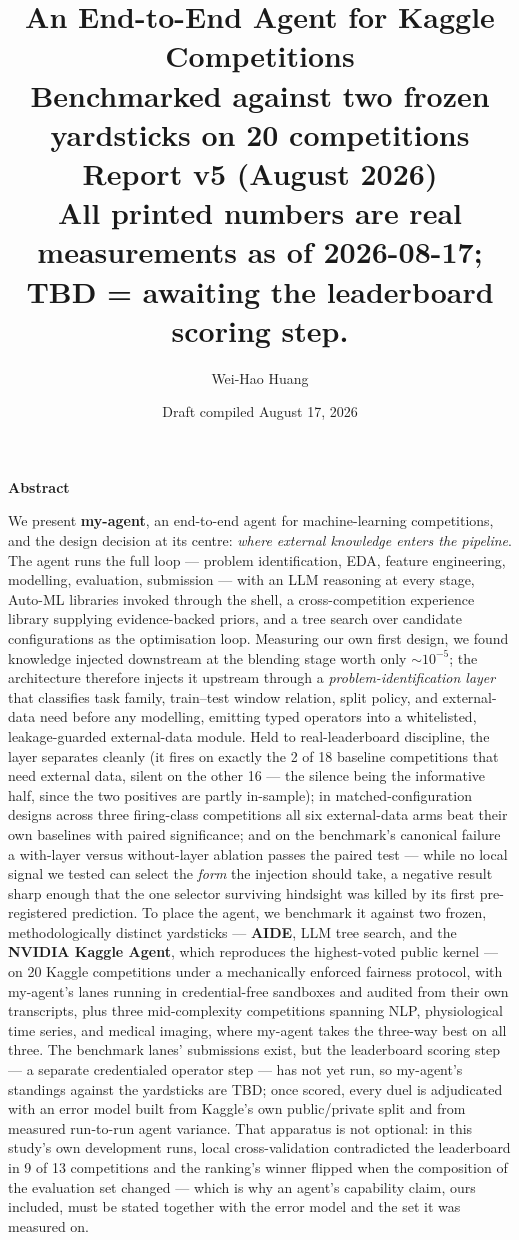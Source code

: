 \documentclass[11pt,a4paper]{article}
\title{\textbf{An End-to-End Agent for Kaggle Competitions}\\
\large Benchmarked against two frozen yardsticks on 20 competitions\\
Report v5 (August 2026)\\
\normalsize\textcolor{orange!85!black}{All printed numbers are real measurements as of 2026-08-17; TBD = awaiting the leaderboard scoring step.}}
\author{Wei-Hao Huang}
\date{Draft compiled August 17, 2026}
\begin{document}
\maketitle

\begin{center}\textbf{\large Abstract}\end{center}
\noindent We present \textbf{my-agent}, an end-to-end agent for machine-learning competitions, and the design decision at its centre: \emph{where external knowledge enters the pipeline}. The agent runs the full loop --- problem identification, EDA, feature engineering, modelling, evaluation, submission --- with an LLM reasoning at every stage, Auto-ML libraries invoked through the shell, a cross-competition experience library supplying evidence-backed priors, and a tree search over candidate configurations as the optimisation loop. Measuring our own first design, we found knowledge injected downstream at the blending stage worth only ${\sim}10^{-5}$; the architecture therefore injects it upstream through a \emph{problem-identification layer} that classifies task family, train--test window relation, split policy, and external-data need before any modelling, emitting typed operators into a whitelisted, leakage-guarded external-data module. Held to real-leaderboard discipline, the layer separates cleanly (it fires on exactly the 2 of 18 baseline competitions that need external data, silent on the other 16 --- the silence being the informative half, since the two positives are partly in-sample); in matched-configuration designs across three firing-class competitions all six external-data arms beat their own baselines with paired significance; and on the benchmark's canonical failure a with-layer versus without-layer ablation passes the paired test --- while no local signal we tested can select the \emph{form} the injection should take, a negative result sharp enough that the one selector surviving hindsight was killed by its first pre-registered prediction. To place the agent, we benchmark it against two frozen, methodologically distinct yardsticks --- \textbf{AIDE}, LLM tree search, and the \textbf{NVIDIA Kaggle Agent}, which reproduces the highest-voted public kernel --- on 20 Kaggle competitions under a mechanically enforced fairness protocol, with my-agent's lanes running in credential-free sandboxes and audited from their own transcripts, plus three mid-complexity competitions spanning NLP, physiological time series, and medical imaging, where my-agent takes the three-way best on all three. The benchmark lanes' submissions exist, but the leaderboard scoring step --- a separate credentialed operator step --- has not yet run, so my-agent's standings against the yardsticks are TBD; once scored, every duel is adjudicated with an error model built from Kaggle's own public/private split and from measured run-to-run agent variance. That apparatus is not optional: in this study's own development runs, local cross-validation contradicted the leaderboard in 9 of 13 competitions and the ranking's winner flipped when the composition of the evaluation set changed --- which is why an agent's capability claim, ours included, must be stated together with the error model and the set it was measured on.
\end{document}
